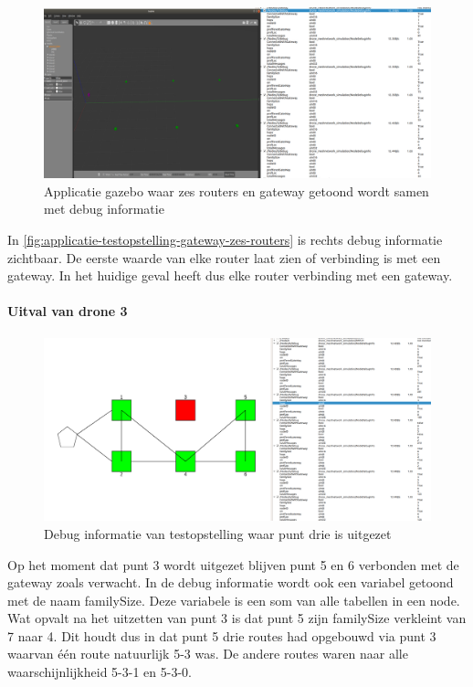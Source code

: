 \documentclass[a4paper, 11pt, oneside]{report}
\begin{document}
\begin{figure}[H]
	\begin{center}\includegraphics[width=1\linewidth]{Afbeeldingen/testopstellingmetzes_debug_info_fusion.png}\end{center}
	\caption{Applicatie gazebo waar zes routers en gateway getoond wordt samen met debug informatie}
	\label{fig:applicatie-testopstelling-gateway-zes-routers}
\end{figure}  

In \autoref{fig:applicatie-testopstelling-gateway-zes-routers} is rechts debug informatie zichtbaar.
De eerste waarde van elke router laat zien of verbinding is met een gateway.
In het huidige geval heeft dus elke router verbinding met een gateway.

\paragraph{Uitval van drone 3}

\begin{figure}[H]
	\begin{center}\includegraphics[width=\linewidth]{Afbeeldingen/testopstellingmetzes_debug_info_drie_is_uit.png}\end{center}
	\caption{Debug informatie van testopstelling waar punt drie is uitgezet}
	\label{fig:applicatie-testopstelling-gateway-zes-routers-drie-is-uit}
\end{figure}   
Op het moment dat punt 3 wordt uitgezet blijven punt 5 en 6 verbonden met de gateway zoals verwacht.
In de debug informatie wordt ook een variabel getoond met de naam familySize. 
Deze variabele is een som van alle tabellen in een node.  
Wat opvalt na het uitzetten van punt 3 is dat punt 5 zijn familySize verkleint van 7 naar 4. 
Dit houdt dus in dat punt 5 drie routes had opgebouwd via punt 3 waarvan één route natuurlijk 5-3 was.
De andere routes waren naar alle waarschijnlijkheid 5-3-1 en 5-3-0.
\end{document}
